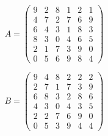 \documentclass[a4paper, 12pt]{article}
\begin{document}
\begin{enumerate}
\begin{figure}[h!]
\begin{subfigure}{0.4\textwidth}
                    \centering
                    \[
                        A = \left(\begin{array}{cccccc}
                            9 & 2 & 8 & 1 & 2 & 1 \\
                            4 & 7 & 2 & 7 & 6 & 9 \\
                            6 & 4 & 3 & 1 & 8 & 3 \\
                            8 & 3 & 0 & 4 & 6 & 5 \\
                            2 & 1 & 7 & 3 & 9 & 0 \\
                            0 & 5 & 6 & 9 & 8 & 4 
                        \end{array}\right)    
                    \]
                \end{subfigure}
                \begin{subfigure}{0.4\textwidth}
                    \centering
                    \[
                        B = \left(\begin{array}{cccccc}
                            9 & 4 & 8 & 2 & 2 & 2 \\
                            2 & 7 & 1 & 7 & 3 & 9 \\
                            6 & 8 & 3 & 2 & 8 & 6 \\
                            4 & 3 & 0 & 4 & 3 & 5 \\
                            2 & 2 & 7 & 6 & 9 & 0 \\
                            0 & 5 & 3 & 9 & 4 & 4 
                        \end{array}\right)    
                    \]
                \end{subfigure}
            \end{figure}
        \end{enumerate}

    
\end{document}
